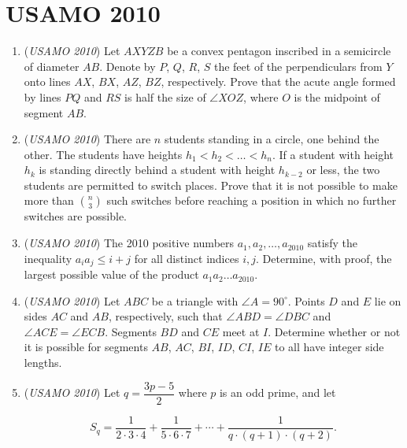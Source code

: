 \section{USAMO 2010}
        \begin{enumerate}
        	\item (\textit{USAMO 2010}) Let $AXYZB$ be a convex pentagon inscribed in a semicircle of diameter $AB$. Denote by $P$, $Q$, $R$, $S$ the feet of the perpendiculars from $Y$ onto lines $AX$, $BX$, $AZ$, $BZ$, respectively.  Prove that the acute angle formed by lines $PQ$ and $RS$ is half the size of $\angle XOZ$, where $O$ is the midpoint of segment $AB$.


 

	\item (\textit{USAMO 2010}) There are $n$ students standing in a circle, one behind the other. The students have heights $h_1<h_2<\dots <h_n$. If a student with height $h_k$ is standing directly behind a student with height $h_{k-2}$ or less, the two students are permitted to switch places. Prove that it is not possible to make more than $\binom{n}{3}$ such switches before reaching a position in which no further switches are possible.


 

	\item (\textit{USAMO 2010}) The 2010 positive numbers $a_1, a_2, \ldots , a_{2010}$ satisfy the inequality $a_ia_j\leq i+j$ for all distinct indices $i, j$. Determine, with proof, the largest possible value of the product $a_1a_2\ldots a_{2010}$.


 

	\item (\textit{USAMO 2010}) Let $ABC$ be a triangle with $\angle A=90^{\circ}$. Points $D$ and $E$ lie on sides $AC$ and $AB$, respectively, such that $\angle ABD=\angle DBC$ and $\angle ACE=\angle ECB$. Segments $BD$ and $CE$ meet at $I$. Determine whether or not it is possible for segments $AB$, $AC$, $BI$, $ID$, $CI$, $IE$ to all have integer side lengths.


 

	\item (\textit{USAMO 2010}) Let $q = \dfrac{3p-5}{2}$ where $p$ is an odd prime, and let


 

 \[S_q =    \frac{1}{2\cdot 3 \cdot 4} +   \frac{1}{5\cdot 6 \cdot 7} + \cdots +   \frac{1}{q\cdot (q+1) \cdot (q+2)}.\]


 



\end{enumerate}
